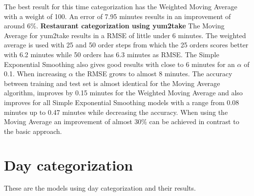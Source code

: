 The best result for this time categorization has the Weighted Moving Average with a weight of 100. An error of 7.95 minutes results in an improvement of around 6\%.
\newline\newline\textbf{Restaurant categorization using yum2take}\newline
The Moving Average for yum2take results in a RMSE of little under 6 minutes. The weighted average is used with 25 and 50 order steps from which the 25 orders scores better with 6.2 minutes while 50 orders has 6.3 minutes as RMSE. The Simple Exponential Smoothing also gives good results with close to 6 minutes for an $\alpha$ of 0.1. When increasing $\alpha$ the RMSE grows to almost 8 minutes. The accuracy between training and test set is almost identical for the Moving Average algorithm, improves by 0.15 minutes for the Weighted Moving Average and also improves for all Simple Exponential Smoothing models with a range from 0.08 minutes up to 0.47 minutes while decreasing the accuracy.\newline
When using the Moving Average an improvement of almost 30\% can be achieved in contrast to the basic approach.
\section{Day categorization}\label{section:Day categorization}
These are the models using day categorization and their results.
